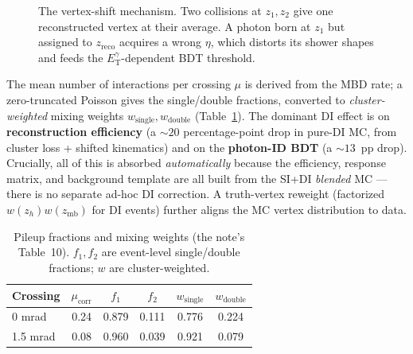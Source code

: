 \documentclass[11pt]{article}
\newcommand{\ETg}{E_{\mathrm{T}}^{\gamma}}
\begin{document}
\begin{figure}[h]
\centering
{}
\caption{The vertex-shift mechanism. Two collisions at $z_1,z_2$ give one reconstructed vertex at
their average. A photon born at $z_1$ but assigned to $z_{\mathrm{reco}}$ acquires a wrong $\eta$,
which distorts its shower shapes and feeds the $\ETg$-dependent BDT threshold.}
\end{figure}

The mean number of interactions per crossing $\mu$ is derived from the MBD rate; a zero-truncated
Poisson gives the single/double fractions, converted to \emph{cluster-weighted} mixing weights
$w_{\mathrm{single}},w_{\mathrm{double}}$ (Table~\ref{tab:pileup}). The dominant DI effect is on
\textbf{reconstruction efficiency} (a $\sim20$ percentage-point drop in pure-DI MC, from cluster
loss + shifted kinematics) and on the \textbf{photon-ID BDT} (a $\sim13$~pp drop). Crucially, all
of this is absorbed \emph{automatically} because the efficiency, response matrix, and background
template are all built from the SI+DI \emph{blended} MC --- there is no separate ad-hoc DI
correction. A truth-vertex reweight (factorized $w(z_h)w(z_{\mathrm{mb}})$ for DI events) further
aligns the MC vertex distribution to data.

\begin{table}[h]
\centering
\caption{Pileup fractions and mixing weights (the note's Table~10). $f_1,f_2$ are
event-level single/double fractions; $w$ are cluster-weighted.}
\label{tab:pileup}
\begin{tabular}{lccccc}
\toprule
Crossing & $\mu_{\mathrm{corr}}$ & $f_1$ & $f_2$ & $w_{\mathrm{single}}$ & $w_{\mathrm{double}}$ \\
\midrule
0 mrad   & 0.24 & 0.879 & 0.111 & 0.776 & 0.224 \\
1.5 mrad & 0.08 & 0.960 & 0.039 & 0.921 & 0.079 \\
\bottomrule
\end{tabular}
\end{table}
\end{document}
